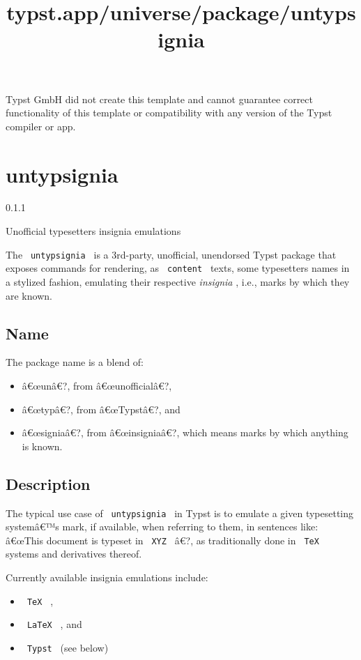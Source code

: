 Typst GmbH did not create this template and cannot guarantee correct
functionality of this template or compatibility with any version of the
Typst compiler or app.


\title{typst.app/universe/package/untypsignia}

\label{banner}
\section{untypsignia}\label{untypsignia}

{ 0.1.1 }

Unofficial typesetter\textquotesingle s insignia emulations

\label{readme}
The \texttt{\ untypsignia\ } is a 3rd-party, unofficial, unendorsed
Typst package that exposes commands for rendering, as
\texttt{\ content\ } texts, some typesetters names in a stylized
fashion, emulating their respective \emph{insignia} , i.e., marks by
which they are known.

\subsection{Name}\label{name}

The package name is a blend of:

\begin{itemize}
\tightlist
\item
  â€œunâ€?, from â€œunofficialâ€?,
\item
  â€œtypâ€?, from â€œTypstâ€?, and
\item
  â€œsigniaâ€?, from â€œinsigniaâ€?, which means marks by which anything
  is known.
\end{itemize}

\subsection{Description}\label{description}

The typical use case of \texttt{\ untypsignia\ } in Typst is to emulate
a given typesetting systemâ€™s mark, if available, when referring to
them, in sentences like: â€œThis document is typeset in \texttt{\ XYZ\ }
â€?, as traditionally done in \texttt{\ TeX\ } systems and derivatives
thereof.

Currently available insignia emulations include:

\begin{itemize}
\tightlist
\item
  \texttt{\ TeX\ } ,
\item
  \texttt{\ LaTeX\ } , and
\item
  \texttt{\ Typst\ } (see below)
\end{itemize}

